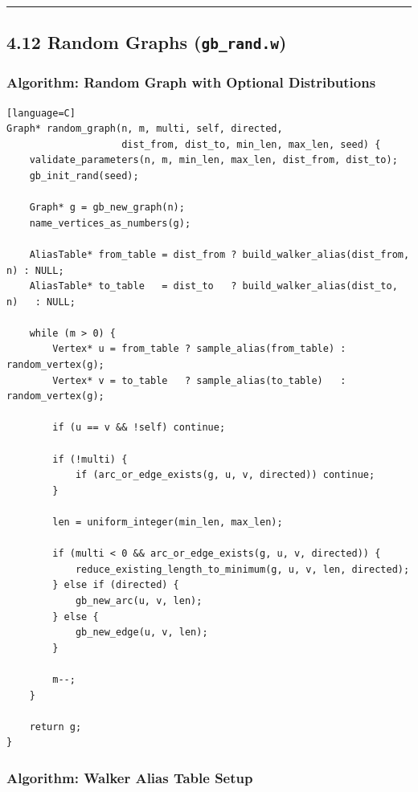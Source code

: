 \documentclass[11pt]{article}
\begin{document}
\begin{center}\rule{0.5\linewidth}{0.5pt}\end{center}

\subsection{\texorpdfstring{4.12 Random Graphs (\texttt{gb\_rand.w})}{4.12 Random Graphs (gb\_rand.w)}}\label{random-graphs-gb_rand.w}

\subsubsection{Algorithm: Random Graph with Optional Distributions}\label{algorithm-random-graph-with-optional-distributions}

\begin{verbatim}[language=C]
Graph* random_graph(n, m, multi, self, directed,
                    dist_from, dist_to, min_len, max_len, seed) {
    validate_parameters(n, m, min_len, max_len, dist_from, dist_to);
    gb_init_rand(seed);

    Graph* g = gb_new_graph(n);
    name_vertices_as_numbers(g);

    AliasTable* from_table = dist_from ? build_walker_alias(dist_from, n) : NULL;
    AliasTable* to_table   = dist_to   ? build_walker_alias(dist_to, n)   : NULL;

    while (m > 0) {
        Vertex* u = from_table ? sample_alias(from_table) : random_vertex(g);
        Vertex* v = to_table   ? sample_alias(to_table)   : random_vertex(g);

        if (u == v && !self) continue;

        if (!multi) {
            if (arc_or_edge_exists(g, u, v, directed)) continue;
        }

        len = uniform_integer(min_len, max_len);

        if (multi < 0 && arc_or_edge_exists(g, u, v, directed)) {
            reduce_existing_length_to_minimum(g, u, v, len, directed);
        } else if (directed) {
            gb_new_arc(u, v, len);
        } else {
            gb_new_edge(u, v, len);
        }

        m--;
    }

    return g;
}
\end{verbatim}

\subsubsection{Algorithm: Walker Alias Table Setup}\label{algorithm-walker-alias-table-setup}
\end{document}

